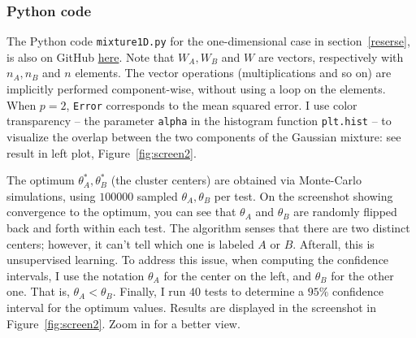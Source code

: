 \documentclass[oneside,10pt]{book}
\begin{document}
\subsubsection{Python code}\label{pyclustrw}

The Python code \texttt{mixture1D.py} for the one-dimensional case in section~\ref{reserse}, is also on GitHub \href{https://github.com/VincentGranville/Machine-Learning/blob/main/Source\%20Code/mixture1D.py}{here}.
 Note that $W_A, W_B$ and $W$ are vectors, respectively with $n_A,n_B$ and $n$ elements. The vector operations (multiplications and so on) are  implicitly performed component-wise, without using a loop on the elements. When $p=2$, \texttt{Error} corresponds to the mean squared error. I use color transparency -- the parameter \texttt{alpha} in
 the histogram function \texttt{plt.hist} -- to visualize the overlap between the two components of the Gaussian mixture: see result in left plot,
 Figure~\ref{fig:screen2}.

The optimum $\theta_A^*,\theta_B^*$ (the cluster centers) are obtained via Monte-Carlo simulations, using
 $\num{100000}$ sampled $\theta_A,\theta_B$ per test. On the screenshot showing convergence to the optimum, you can see
 that $\theta_A$ and $\theta_B$ are randomly flipped back and forth within each test. The algorithm senses that there are two distinct centers; however, it can't tell which one is labeled $A$ or $B$.  Afterall, this is \textcolor{index}{unsupervised learning}. To address this issue, when computing the confidence intervals, I use the notation $\theta_A$ for the center on the left, and $\theta_B$ for the other one. That is, $\theta_A < \theta_B$.
Finally, I run $40$ tests to determine a $95\%$ confidence interval for the
 optimum values. Results are displayed in the screenshot in Figure~\ref{fig:screen2}. Zoom in for a better view.  \\
\end{document}
